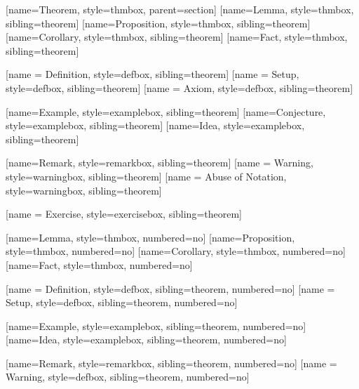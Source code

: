   

[name=Theorem, style=thmbox, parent=section]
[name=Lemma, style=thmbox, sibling=theorem]
[name=Proposition, style=thmbox, sibling=theorem]
[name=Corollary, style=thmbox, sibling=theorem]
[name=Fact, style=thmbox, sibling=theorem]


[name = Definition, style=defbox, sibling=theorem]
[name = Setup, style=defbox, sibling=theorem]
[name = Axiom, style=defbox, sibling=theorem]

[name=Example, style=examplebox, sibling=theorem]
[name=Conjecture, style=examplebox, sibling=theorem]
[name=Idea, style=examplebox, sibling=theorem]

[name=Remark, style=remarkbox, sibling=theorem]
[name = Warning, style=warningbox, sibling=theorem]
[name = Abuse of Notation, style=warningbox, sibling=theorem]

[name = Exercise, style=exercisebox, sibling=theorem]


[name=Lemma, style=thmbox, numbered=no]
[name=Proposition, style=thmbox, numbered=no]
[name=Corollary, style=thmbox, numbered=no]
[name=Fact, style=thmbox, numbered=no]

[name = Definition, style=defbox, sibling=theorem, numbered=no]
[name = Setup, style=defbox, sibling=theorem, numbered=no]

[name=Example, style=examplebox, sibling=theorem, numbered=no]
[name=Idea, style=examplebox, sibling=theorem, numbered=no]

[name=Remark, style=remarkbox, sibling=theorem, numbered=no]
[name = Warning, style=defbox, sibling=theorem, numbered=no]

\theoremstyle{definition}
\newtheorem{problem}{Problem}[chapter]
\renewcommand\theproblem{\thechapter.\Alph{problem}}



